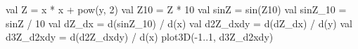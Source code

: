 \documentclass[portrait,a0b,final,a4resizeable]{a0poster}
\def\jointspacing{\vspace{0.3in}}
\begin{document}
\begin{poster}
\begin{multicols}{2}
\null\hspace*{2cm}\begin{minipage}[c]{0.515\columnwidth}
\begin{kotlinlisting}
val Z = x * x + pow(y, 2)
val Z10 = Z * 10
val sinZ = sin(Z10)
val sinZ_10 = sinZ / 10
val dZ_dx = d(sinZ_10) / d(x)
val d2Z_dxdy = d(dZ_dx) / d(y)
val d3Z_d2xdy = d(d2Z_dxdy) / d(x)
plot3D(-1..1, d3Z_d2xdy)
\end{kotlinlisting}
\end{minipage}
      \null\hspace*{2cm}\begin{minipage}[c]{0.30\columnwidth}\center{}\end{minipage}

      \jointspacing





\end{multicols}
\end{poster}
\end{document}

